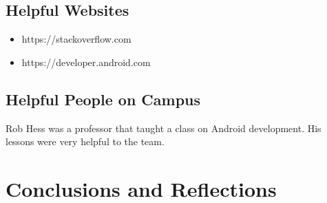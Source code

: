 \documentclass[onecolumn, draftclsnofoot,10pt, compsoc]{IEEEtran}
\begin{document}
 \subsection{Helpful Websites}
 \begin{itemize}
     \item https://stackoverflow.com
     \item https://developer.android.com
 \end{itemize}
 
 \subsection{Helpful People on Campus}
 Rob Hess was a professor that taught a class on Android development. His lessons were very helpful to the team.
 \section{Conclusions and Reflections}
\end{document}
